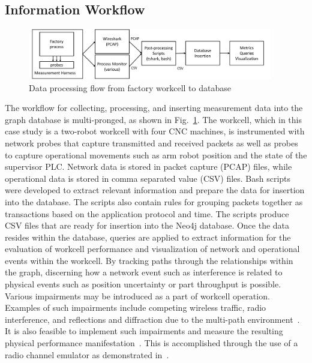 \subsection{Information Workflow}

\begin{figure}[!ht]
    \centering
    \includegraphics[width=0.95\textwidth]{./chapter-gdb-appl/figures/database/work-flow.pdf}
    \caption{Data processing flow from factory workcell to database}
    \label{gdbappl:fig::work-flow}
\end{figure}

The workflow for collecting, processing, and inserting measurement data into the graph database is multi-pronged, as shown in Fig.~\ref{gdbappl:fig::work-flow}.  The workcell, which in this case study is a two-robot workcell with four CNC machines, is instrumented with network probes that capture transmitted and received packets as well as probes to capture operational movements such as arm robot position and the state of the supervisor PLC.  Network data is stored in packet capture (PCAP) files, while operational data is stored in comma separated value (CSV) files. Bash scripts were developed to extract relevant information and prepare the data for insertion into the database. The scripts also contain rules for grouping packets together as transactions based on the application protocol and time. The scripts produce CSV files that are ready for insertion into the Neo4j database.  Once the data resides within the database, queries are applied to extract information for the evaluation of workcell performance and visualization of network and operational events within the workcell. By tracking paths through the relationships within the graph, discerning how a network event such as interference is related to physical events such as position uncertainty or part throughput is possible. Various impairments may be introduced as a part of workcell operation.  Examples of such impairments include competing wireless traffic, radio interference, and reflections and diffraction due to the multi-path environment~\cite{Candell2017.NIST1951}. It is also feasible to implement such impairments and measure the resulting physical performance manifestation~\cite{Liu2019vancouver}. This is accomplished through the use of a radio channel emulator as demonstrated in~\cite{Candell2019vancouver}.

